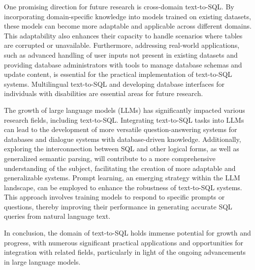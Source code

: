 One promising direction for future research is cross-domain text-to-SQL. By incorporating domain-specific knowledge into models trained on existing datasets, these models can become more adaptable and applicable across different domains. This adaptability also enhances their capacity to handle scenarios where tables are corrupted or unavailable. Furthermore, addressing real-world applications, such as advanced handling of user inputs not present in existing datasets and providing database administrators with tools to manage database schemas and update content, is essential for the practical implementation of text-to-SQL systems. Multilingual text-to-SQL and developing database interfaces for individuals with disabilities are essential areas for future research.

The growth of large language models (LLMs) has significantly impacted various research fields, including text-to-SQL. Integrating text-to-SQL tasks into LLMs can lead to the development of more versatile question-answering systems for databases and dialogue systems with database-driven knowledge. Additionally, exploring the interconnection between SQL and other logical forms, as well as generalized semantic parsing, will contribute to a more comprehensive understanding of the subject, facilitating the creation of more adaptable and generalizable systems.
Prompt learning, an emerging strategy within the LLM landscape, can be employed to enhance the robustness of text-to-SQL systems. This approach involves training models to respond to specific prompts or questions, thereby improving their performance in generating accurate SQL queries from natural language text. 

In conclusion, the domain of text-to-SQL holds immense potential for growth and progress, with numerous significant practical applications and opportunities for integration with related fields, particularly in light of the ongoing advancements in large language models.